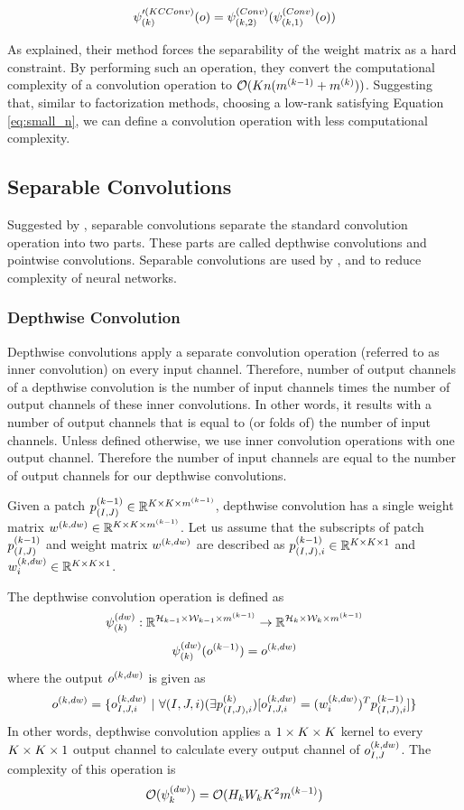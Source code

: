 $$ \psi_{(k)}'^{(KCConv)}(o) = \psi^{(Conv)}_{(k,2)}(\psi^{(Conv)}_{(k,1)}(o))$$

As \cite{alvarez2016decomposeme} explained, their method forces the separability of the weight matrix as a hard constraint. By performing such an operation, they convert the computational complexity of a convolution operation to $\mathcal{O}(K n(m^{(k-1)} +m^{(k)}))$. Suggesting that, similar to factorization methods, choosing a low-rank satisfying Equation \ref{eq:small_n}, we can define a convolution operation with less computational complexity.


\subsection{Separable Convolutions}
Suggested by \cite{sifre2014rigid}, separable convolutions separate the standard convolution operation into two parts. These parts are called depthwise convolutions and pointwise convolutions. Separable convolutions are used by \cite{chollet2016xception}, \cite{howard2017mobilenets} and \cite{howard2017mobilenets} to reduce complexity of neural networks.
\subsubsection{Depthwise Convolution}
Depthwise convolutions apply a separate convolution operation (referred to as inner convolution) on every input channel. Therefore, number of output channels of a depthwise convolution is the number of input channels times the number of output channels of these inner convolutions. In other words, it results with a number of output channels that is equal to (or folds of) the number of input channels. Unless defined otherwise, we use inner convolution operations with one output channel. Therefore the number of input channels are equal to the number of output channels for our depthwise convolutions.

Given a patch $ p^{(k-1)}_{(I,J)} \in \mathbb{R}^{K \times K \times m^{(k-1)}}$, depthwise convolution has a single weight matrix $w^{(k, dw)} \in \mathbb{R}^{K \times K \times m^{(k-1)}}$. Let us assume that the subscripts of patch $p^{(k-1)}_{(I,J)}$ and weight matrix $w^{(k, dw)}$ are described as $p^{(k-1)}_{(I,J),i} \in \mathbb{R}^{K \times K \times 1}$ and $w^{(k, dw)}_{i} \in \mathbb{R}^{K \times K \times 1}$.

The depthwise convolution operation is defined as
$$ \psi_{(k)}^{(dw)} : \mathbb{R}^{\mathcal{H}_{k-1} \times \mathcal{W}_{k-1} \times m^{(k-1)}} \rightarrow \mathbb{R}^{\mathcal{H}_{k} \times \mathcal{W}_{k} \times m^{(k-1)}} $$ 
$$\psi_{(k)}^{(dw)}(o^{(k-1)}) = o^{(k, dw)} $$
where the output $o^{(k, dw)}$ is given as
$$ \ok{k, dw} = \{ \oki{k, dw}{I,J,i} \ | \ \forall (I,J,i) (\exists \pki{k}{(I,J),i}) [\oki{k, dw}{I,J,i} = (\wki{k, dw}{i})^T \pki{k-1}{(I,J),i}  ] \} $$  %
In other words, depthwise convolution applies a $1 \times K \times K$ kernel to every $K \times K \times 1$ output channel to calculate every output channel of $o^{(k,dw)}_{I,J}$. The complexity of this operation is
$$ \mathcal{O} (\psi_k^{(dw)}) = \mathcal{O} (H_kW_kK^2m^{(k-1)}) $$

